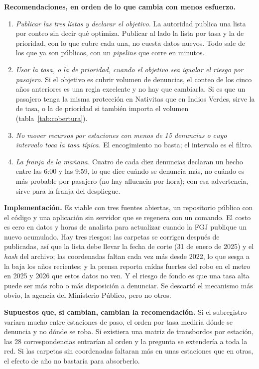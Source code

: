 \documentclass[conference]{IEEEtran}
\begin{document}
\textbf{Recomendaciones, en orden de lo que cambia con menos esfuerzo.}
\begin{enumerate}
\item \emph{Publicar las tres listas y declarar el objetivo.} La autoridad publica una lista por conteo sin decir qué optimiza. Publicar al lado la lista por tasa y la de prioridad, con lo que cubre cada una, no cuesta datos nuevos. Todo sale de los que ya son públicos, con un \emph{pipeline} que corre en minutos.
\item \emph{Usar la tasa, o la de prioridad, cuando el objetivo sea igualar el riesgo por pasajero.} Si el objetivo es cubrir volumen de denuncias, el conteo de los cinco años anteriores es una regla excelente y no hay que cambiarla. Si es que un pasajero tenga la misma protección en Nativitas que en Indios Verdes, sirve la de tasa, o la de prioridad si también importa el volumen (tabla~\ref{tab:cobertura}).
\item \emph{No mover recursos por estaciones con menos de 15 denuncias o cuyo intervalo toca la tasa típica.} El encogimiento no basta; el intervalo es el filtro.
\item \emph{La franja de la mañana.} Cuatro de cada diez denuncias declaran un hecho entre las 6:00 y las 9:59, lo que dice cuándo se denuncia más, no cuándo es más probable por pasajero (no hay afluencia por hora); con esa advertencia, sirve para la franja del despliegue.
\end{enumerate}

\textbf{Implementación.} Es viable con tres fuentes abiertas, un repositorio público con el código y una aplicación sin servidor que se regenera con un comando. El costo es cero en datos y horas de analista para actualizar cuando la FGJ publique un nuevo acumulado. Hay tres riesgos: las carpetas se corrigen después de publicadas, así que la lista debe llevar la fecha de corte (31 de enero de 2025) y el \emph{hash} del archivo; las coordenadas faltan cada vez más desde 2022, lo que sesga a la baja los años recientes; y la prensa reporta caídas fuertes del robo en el metro en 2025 y 2026 que estos datos no ven. Y el riesgo de fondo es que una tasa alta puede ser más robo o más disposición a denunciar. Se descartó el mecanismo más obvio, la agencia del Ministerio Público, pero no otros.

\textbf{Supuestos que, si cambian, cambian la recomendación.} Si el subregistro variara mucho entre estaciones de paso, el orden por tasa mediría dónde se denuncia y no dónde se roba. Si existiera una matriz de transbordos por estación, las 28 correspondencias entrarían al orden y la pregunta se extendería a toda la red. Si las carpetas sin coordenadas faltaran más en unas estaciones que en otras, el efecto de año no bastaría para absorberlo.
\end{document}
